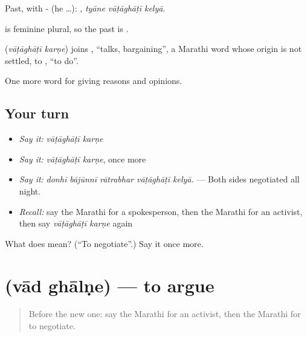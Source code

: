 Past, with - (he …):   , \emph{tyāne vāṭāghāṭī kelyā}.

 is feminine plural, so the past is .

\begin{cousinweb}
\textbf{ } (\emph{vāṭāghāṭī karṇe}) joins , \textquotedblleft{}talks, bargaining\textquotedblright{}, a Marathi word whose origin is not settled, to , \textquotedblleft{}to do\textquotedblright{}.
\end{cousinweb}

\begin{grammarlens}[title={What you've built}]
One more word for giving reasons and opinions.
\end{grammarlens}

\subsection*{Your turn}
\begin{itemize}
\raggedright
  \item \emph{Say it:} \emph{vāṭāghāṭī karṇe}
  \item \emph{Say it:} \emph{vāṭāghāṭī karṇe}, once more
  \item \emph{Say it:} \emph{donhī bājūnnī rātrabhar vāṭāghāṭī kelyā.} — Both sides negotiated all night.
  \item \emph{Recall:} say the Marathi for a spokesperson, then the Marathi for an activist, then say \emph{vāṭāghāṭī karṇe} again
\end{itemize}

\begin{tcolorbox}[breakable,colback=teal!4,colframe=teal!35!black,title={Before you move on}]
What does   mean? (\textquotedblleft{}To negotiate\textquotedblright{}.) Say it once more.
\end{tcolorbox}
\section[\texorpdfstring{\mr{वाद} \mr{घालणे} (vād ghālṇe)}{वाद घालणे (vād ghālṇe)}]{  (vād ghālṇe) — to argue}

\label{lesson:MR-C365-vad-ghalne}



\begin{quote}
Before the new one: say the Marathi for an activist, then the Marathi for to negotiate.
\end{quote}

